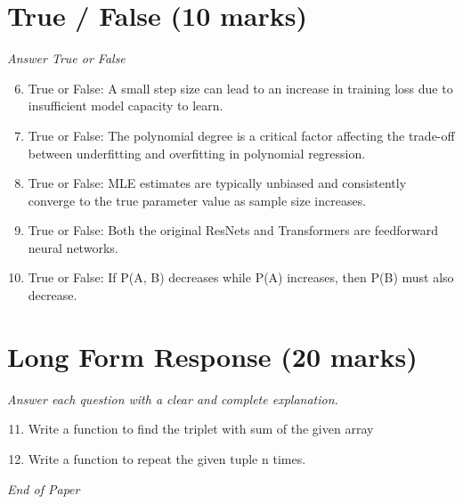 \documentclass[12pt]{article}
\begin{document}
\section*{True / False (10 marks)}
\textit{Answer True or False}
\begin{enumerate}[label=\arabic*.]
\setcounter{enumi}{5}
\item True or False: A small step size can lead to an increase in training loss due to insufficient model capacity to learn.
\item True or False: The polynomial degree is a critical factor affecting the trade-off between underfitting and overfitting in polynomial regression.
\item True or False: MLE estimates are typically unbiased and consistently converge to the true parameter value as sample size increases.
\item True or False: Both the original ResNets and Transformers are feedforward neural networks.
\item True or False: If P(A, B) decreases while P(A) increases, then P(B) must also decrease.
\end{enumerate}

\section*{Long Form Response (20 marks)}
\textit{Answer each question with a clear and complete explanation.}
\begin{enumerate}[label=\arabic*.]
\setcounter{enumi}{10}
\item Write a function to find the triplet with sum of the given array
\item Write a function to repeat the given tuple n times.
\end{enumerate}

\vfill
\noindent\textit{End of Paper}
\end{document}
